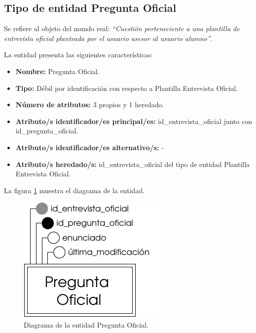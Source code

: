 \subsection{Tipo de entidad Pregunta Oficial}

   \begin{description}

   \item[Definición] Se refiere al objeto del mundo real: \emph{``Cuestión
   perteneciente a una plantilla de entrevista oficial planteada por el usuario
   asesor al usuario alumno''}.

   \item[Características] La entidad presenta las siguientes características:
      \begin{itemize}
         \item \textbf{Nombre:} Pregunta Oficial.
         \item \textbf{Tipo:} Débil por identificación con respecto a
         Plantilla Entrevista Oficial.
         \item \textbf{Número de atributos:} 3 propios y 1 heredado.
         \item \textbf{Atributo/s identificador/es principal/es:} id\_entrevista\_oficial
         junto con id\_pregunta\_oficial.
         \item \textbf{Atributo/s identificador/es alternativo/s:} -
         \item \textbf{Atributo/s heredado/s:} id\_entrevista\_oficial del tipo
         de entidad Plantilla Entrevista Oficial.
      \end{itemize}

   \item[Diagrama] La figura \ref{diagramaPregOfi} muestra el diagrama de la entidad.
   \item \begin{figure}[!ht]
            \begin{center}
            \includegraphics[]{07.Modelo_Entidad-Interrelacion/7.2.Analisis_Entidades/diagramas/preg_ofi.pdf}
            \caption{Diagrama de la entidad Pregunta Oficial.}
            \label{diagramaPregOfi}
            \end{center}
         \end{figure}


\end{description}
